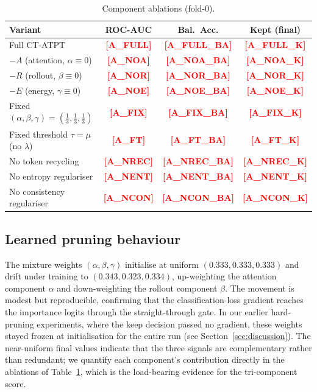 \documentclass[journal]{IEEEtran}
\newcommand{\R}[1]{\textcolor{red}{\textbf{[#1]}}}
\begin{document}
\begin{table}[t]
\centering
\caption{Component ablations (fold-0).}
\label{tab:ablation}
\begin{tabular}{lccc}
\toprule
\textbf{Variant} & \textbf{ROC-AUC} & \textbf{Bal.\ Acc.} & \textbf{Kept (final)} \\
\midrule
Full CT-ATPT                                        & \R{A\_FULL}  & \R{A\_FULL\_BA}  & \R{A\_FULL\_K}  \\
$-A$ (attention, $\alpha{\equiv}0$)                 & \R{A\_NOA}   & \R{A\_NOA\_BA}   & \R{A\_NOA\_K}   \\
$-R$ (rollout, $\beta{\equiv}0$)                    & \R{A\_NOR}   & \R{A\_NOR\_BA}   & \R{A\_NOR\_K}   \\
$-E$ (energy, $\gamma{\equiv}0$)                    & \R{A\_NOE}   & \R{A\_NOE\_BA}   & \R{A\_NOE\_K}   \\
Fixed $(\alpha,\beta,\gamma)=(\tfrac13,\tfrac13,\tfrac13)$ & \R{A\_FIX}  & \R{A\_FIX\_BA}   & \R{A\_FIX\_K}   \\
Fixed threshold $\tau=\mu$ (no $\lambda$)           & \R{A\_FT}    & \R{A\_FT\_BA}    & \R{A\_FT\_K}    \\
No token recycling                                  & \R{A\_NREC}  & \R{A\_NREC\_BA}  & \R{A\_NREC\_K}  \\
No entropy regulariser                              & \R{A\_NENT}  & \R{A\_NENT\_BA}  & \R{A\_NENT\_K}  \\
No consistency regulariser                          & \R{A\_NCON}  & \R{A\_NCON\_BA}  & \R{A\_NCON\_K}  \\
\bottomrule
\end{tabular}
\end{table}

\subsection{Learned pruning behaviour}\label{ssec:learned}
The mixture weights $(\alpha,\beta,\gamma)$ initialise at uniform
$(0.333, 0.333, 0.333)$ and drift under training to
$(0.343, 0.323, 0.334)$, up-weighting the attention component $\alpha$ and
down-weighting the rollout component $\beta$. The movement is modest but
reproducible, confirming that the classification-loss gradient reaches the
importance logits through the straight-through gate. In our earlier
hard-pruning experiments, where the keep decision passed no gradient, these
weights stayed frozen at initialisation for the entire run
(see Section~\ref{sec:discussion}). The near-uniform final values indicate
that the three signals are complementary rather than redundant; we quantify
each component's contribution directly in the ablations of
Table~\ref{tab:ablation}, which is the load-bearing evidence for the
tri-component score.
\end{document}
